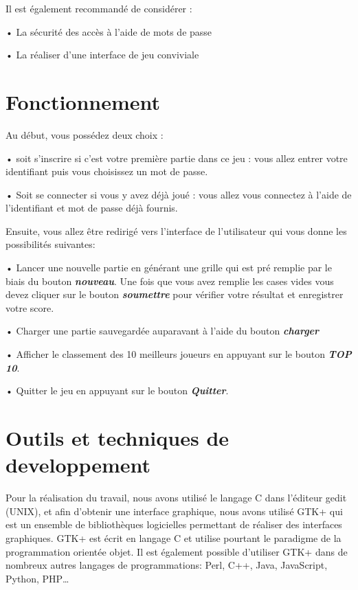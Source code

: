 \documentclass{article}
\begin{document}
    
\noindent Il est également recommandé de considérer :

	• La sécurité des accès à l’aide de mots de passe
    
	• La réaliser d’une interface de jeu conviviale

\section{Fonctionnement}
Au début, vous possédez deux choix :

    • soit s’inscrire si c’est votre première partie dans ce jeu :     vous allez entrer votre identifiant puis vous choisissez un mot de passe.
    
    • Soit se connecter si vous y avez déjà joué : vous allez vous connectez à l’aide de l’identifiant et mot de passe déjà fournis.
    \newline
    
\noindent Ensuite, vous allez être redirigé vers l’interface de l’utilisateur qui vous donne les possibilités suivantes:

    • Lancer une nouvelle partie en générant une grille qui est pré remplie par le biais du bouton \textbf{\textit{nouveau}}.
    Une fois que vous avez remplie les cases vides vous devez cliquer sur le bouton \textbf{\textit{soumettre}} pour vérifier votre résultat et enregistrer votre score.
    
    • Charger une partie sauvegardée auparavant à l’aide du bouton \textbf{\textit{charger}} 
    
    • Afficher le classement des 10 meilleurs joueurs en appuyant sur le bouton \textbf{\textit{TOP 10}}.
    
    • Quitter le jeu en appuyant sur le bouton \textbf{\textit{Quitter}}.
    
\section{Outils et techniques de developpement}
Pour la réalisation du travail, nous avons utilisé le langage C dans l'éditeur gedit (UNIX), et afin d’obtenir une interface graphique, nous avons utilisé GTK+ qui est un ensemble de bibliothèques logicielles permettant de réaliser des interfaces graphiques. GTK+ est écrit en langage C et utilise pourtant le paradigme de la programmation orientée objet. Il est également possible d'utiliser GTK+ dans de nombreux autres langages de programmations: Perl, C++, Java, JavaScript, Python, PHP…
\end{document}
